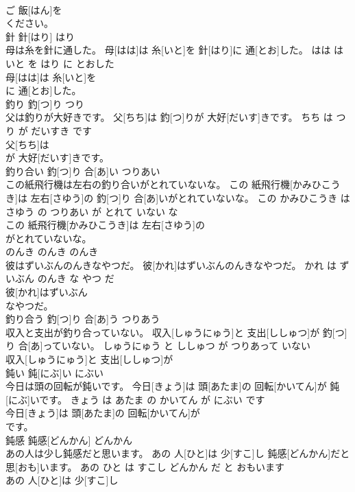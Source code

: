 \documentclass[8pt]{extreport}
\begin{document}
\begin{CJK}{UTF8}{min}
\\	ご 飯[はん]を
\\	ください。			
\\	針	針[はり]	はり	
\\	母は糸を針に通した。	母[はは]は 糸[いと]を 針[はり]に 通[とお]した。	はは は いと を はり に とおした	
\\	母[はは]は 糸[いと]を
\\	に 通[とお]した。			
\\	釣り	釣[つ]り	つり	
\\	父は釣りが大好きです。	父[ちち]は 釣[つ]りが 大好[だいす]きです。	ちち は つり が だいすき です	
\\	父[ちち]は
\\	が 大好[だいす]きです。			
\\	釣り合い	釣[つ]り 合[あ]い	つりあい	
\\	この紙飛行機は左右の釣り合いがとれていないな。	この 紙飛行機[かみひこうき]は 左右[さゆう]の 釣[つ]り 合[あ]いがとれていないな。	この かみひこうき は さゆう の つりあい が とれて いない な	
\\	この 紙飛行機[かみひこうき]は 左右[さゆう]の
\\	がとれていないな。			
\\	のんき	のんき	のんき	
\\	彼はずいぶんのんきなやつだ。	彼[かれ]はずいぶんのんきなやつだ。	かれ は ずいぶん のんき な やつ だ	
\\	彼[かれ]はずいぶん
\\	なやつだ。			
\\	釣り合う	釣[つ]り 合[あ]う	つりあう	
\\	収入と支出が釣り合っていない。	収入[しゅうにゅう]と 支出[ししゅつ]が 釣[つ]り 合[あ]っていない。	しゅうにゅう と ししゅつ が つりあって いない	
\\	収入[しゅうにゅう]と 支出[ししゅつ]が
\\	鈍い	鈍[にぶ]い	にぶい	
\\	今日は頭の回転が鈍いです。	今日[きょう]は 頭[あたま]の 回転[かいてん]が 鈍[にぶ]いです。	きょう は あたま の かいてん が にぶい です	
\\	今日[きょう]は 頭[あたま]の 回転[かいてん]が
\\	です。			
\\	鈍感	鈍感[どんかん]	どんかん	
\\	あの人は少し鈍感だと思います。	あの 人[ひと]は 少[すこ]し 鈍感[どんかん]だと 思[おも]います。	あの ひと は すこし どんかん だ と おもいます	
\\	あの 人[ひと]は 少[すこ]し

\end{CJK}
\end{document}
